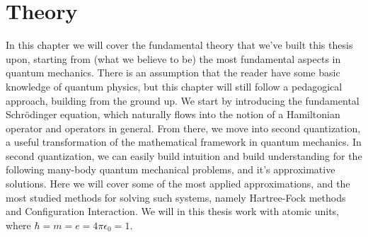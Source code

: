 \documentclass{subfiles}
\begin{document}
\chapter{Theory}
In this chapter we will cover the fundamental theory that we've built this thesis upon, starting from (what we believe to be) the most fundamental aspects in quantum mechanics.
There is an assumption that the reader have some basic knowledge of quantum physics, but this chapter will still follow a pedagogical approach, building from the ground up.
We start by introducing the fundamental Schrödinger equation, which naturally flows into the notion of a Hamiltonian operator and operators in general. From there, we move into 
second quantization, a useful transformation of the mathematical framework in quantum mechanics. In second quantization, we can easily build intuition and build understanding for
the following many-body quantum mechanical problems, and it's approximative solutions. Here we will cover some of the most applied approximations, and the most studied methods for solving
such systems, namely Hartree-Fock methods and Configuration Interaction. We will in this thesis work with atomic units, where $\hbar = m = e = 4\pi\epsilon_0 = 1$.
\newpage



\end{document}
